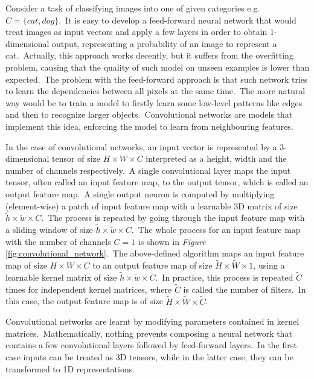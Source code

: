 \documentclass[longabstract, english, mgr]{iithesis}
\theoremstyle{default_theorem_style}\newtheorem{theorem}{Theorem}
\theoremstyle{default_theorem_style}\newtheorem{definition}{Definition}
\begin{document}
Consider a task of classifying images into one of given categories e.g.\ $C = \{cat, dog\}$.\ It is easy to develop
a feed-forward neural network that would treat images as input vectors and apply a few layers in order to obtain
1-dimensional output, representing a probability of an image to represent a cat.\ Actually, this approach works
decently, but it suffers from the overfitting problem, causing that the quality of such model on unseen examples is
lower than expected.\ The problem with the feed-forward approach is that such network tries to learn the dependencies
between all pixels at the same time.\ The more natural way would be to train a model to firstly learn some
low-level patterns like edges and then to recognize larger objects.\ Convolutional networks are models that implement
this idea, enforcing the model to learn from neighbouring features.\newline

\noindent In the case of convolutional networks, an input vector is represented by a 3-dimensional tensor of size
$H \times W \times C$ interpreted as a height, width and  the number of channels respectively.\ A single convolutional
layer maps the input tensor, often called an input feature map, to the output tensor, which is called an output
feature map.\ A single output neuron is computed by multiplying (element-wise) a patch of input feature map with
a learnable 3D matrix of size $\tilde{h} \times \tilde{w} \times C$.\ The process is repeated by going through the
input feature map with a sliding window of size $\tilde{h} \times \tilde{w} \times C$.\ The whole process for an input
feature map with the number of channels $C = 1$ is shown in \textit{Figure}
\ref{fig:convolutional_network}.\ The above-defined algorithm maps an input feature map of size
$H \times W \times C$ to an output feature map of size $\tilde{H} \times \tilde{W} \times 1$, using a learnable
kernel matrix of size $\tilde{h} \times \tilde{w} \times C$.\ In practice, this process is repeated $\tilde{C}$ times
for independent kernel matrices, where $\tilde{C}$ is called the number of filters.\ In this case, the output feature
map is of size $\tilde{H} \times \tilde{W} \times \tilde{C}$.\newline

\noindent Convolutional networks are learnt by modifying parameters contained in kernel matrices.\ Mathematically,
nothing prevents composing a neural network that contains a few convolutional layers followed by feed-forward
layers.\ In the first case inputs can be treated as 3D tensors, while in the latter case, they can be transformed
to 1D representations.
\end{document}
